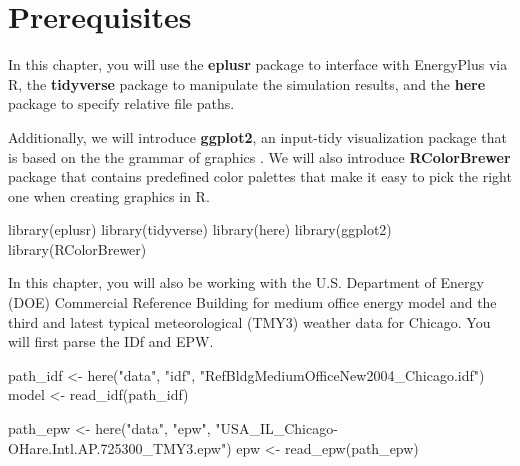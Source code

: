 \documentclass[
]{book}
\newenvironment{Shaded}{\begin{snugshade}}{\end{snugshade}}
\newcommand{\FunctionTok}[1]{\textcolor[rgb]{0.00,0.00,0.00}{#1}}
\newcommand{\NormalTok}[1]{#1}
\newcommand{\OtherTok}[1]{\textcolor[rgb]{0.56,0.35,0.01}{#1}}
\newcommand{\StringTok}[1]{\textcolor[rgb]{0.31,0.60,0.02}{#1}}
\begin{document}
\hypertarget{prerequisites-9}{%
\section{Prerequisites}\label{prerequisites-9}}

In this chapter, you will use the \textbf{eplusr} package to interface with EnergyPlus via R, the \textbf{tidyverse} package to manipulate the simulation results, and the \textbf{here} package to specify relative file paths.

Additionally, we will introduce \textbf{ggplot2}, an input-tidy visualization package that is based on the the grammar of graphics \citep{wilkinson_grammar_2012}. We will also introduce \textbf{RColorBrewer} package that contains predefined color palettes that make it easy to pick the right one when creating graphics in R.

\begin{Shaded}
\begin{Highlighting}[]
\FunctionTok{library}\NormalTok{(eplusr)}
\FunctionTok{library}\NormalTok{(tidyverse)}
\FunctionTok{library}\NormalTok{(here)}
\FunctionTok{library}\NormalTok{(ggplot2)}
\FunctionTok{library}\NormalTok{(RColorBrewer)}
\end{Highlighting}
\end{Shaded}

In this chapter, you will also be working with the U.S. Department of Energy (DOE) Commercial Reference Building for medium office energy model \citep{deru_us_2011} and the third and latest typical meteorological (TMY3) weather data for Chicago. You will first parse the IDf and EPW.

\begin{Shaded}
\begin{Highlighting}[]
\NormalTok{path\_idf }\OtherTok{\textless{}{-}} \FunctionTok{here}\NormalTok{(}\StringTok{"data"}\NormalTok{, }\StringTok{"idf"}\NormalTok{, }\StringTok{"RefBldgMediumOfficeNew2004\_Chicago.idf"}\NormalTok{)}
\NormalTok{model }\OtherTok{\textless{}{-}} \FunctionTok{read\_idf}\NormalTok{(path\_idf)}

\NormalTok{path\_epw }\OtherTok{\textless{}{-}} \FunctionTok{here}\NormalTok{(}\StringTok{"data"}\NormalTok{, }\StringTok{"epw"}\NormalTok{, }\StringTok{"USA\_IL\_Chicago{-}OHare.Intl.AP.725300\_TMY3.epw"}\NormalTok{)}
\NormalTok{epw }\OtherTok{\textless{}{-}} \FunctionTok{read\_epw}\NormalTok{(path\_epw)}
\end{Highlighting}
\end{Shaded}
\end{document}
